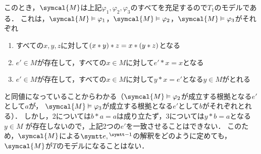 このとき，\(\symcal{M}\)は上記\(\varphi_1, \varphi_2, \varphi_3\)のすべてを充足するので\(T_1\)のモデルである．
これは，\(\symcal{M} \satisfy \varphi_1\)，\(\symcal{M} \satisfy \varphi_2\)，\(\symcal{M} \satisfy \varphi_3\)がそれぞれ
\begin{enumerate}
	\item すべての\(x, y, z\)に対して\(\paren{x \ast y} \ast z = x \ast \paren{y \ast z}\)となる
	\item \(e' \in M\)が存在して，すべての\(x \in M\)に対して\(e' \ast x = x\)となる
	\item \(e' \in M\)が存在して，すべての\(x \in M\)に対して\(y \ast x = e'\)となる\(y \in M\)がとれる
\end{enumerate}
と同値になっていることからわかる（\(\symcal{M} \satisfy \varphi_2\)が成立する根拠となる\(e'\)として\(a\)が，
\(\symcal{M} \satisfy \varphi_3\)が成立する根拠となる\(e'\)として\(b\)がそれぞれとれる）．
しかし，2については\(b \ast a = a\)は成り立たず，3については\(y \ast b = a\)となる\(y \in M\)
が存在しないので，上記2つの\(e'\)を一致させることはできない．
このため，\(\symcal{M}\)による\(\obj{e}, {}^{\obj{-1}}\)の解釈をどのように定めても，
\(\symcal{M}\)が\(T\)のモデルになることはない．

\section*{}

\subsection*{}


